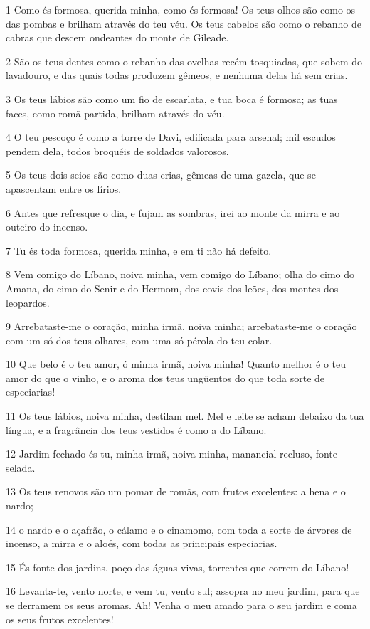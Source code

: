 \par 1 Como és formosa, querida minha, como és formosa! Os teus olhos são como os das pombas e brilham através do teu véu. Os teus cabelos são como o rebanho de cabras que descem ondeantes do monte de Gileade.
\par 2 São os teus dentes como o rebanho das ovelhas recém-tosquiadas, que sobem do lavadouro, e das quais todas produzem gêmeos, e nenhuma delas há sem crias.
\par 3 Os teus lábios são como um fio de escarlata, e tua boca é formosa; as tuas faces, como romã partida, brilham através do véu.
\par 4 O teu pescoço é como a torre de Davi, edificada para arsenal; mil escudos pendem dela, todos broquéis de soldados valorosos.
\par 5 Os teus dois seios são como duas crias, gêmeas de uma gazela, que se apascentam entre os lírios.
\par 6 Antes que refresque o dia, e fujam as sombras, irei ao monte da mirra e ao outeiro do incenso.
\par 7 Tu és toda formosa, querida minha, e em ti não há defeito.
\par 8 Vem comigo do Líbano, noiva minha, vem comigo do Líbano; olha do cimo do Amana, do cimo do Senir e do Hermom, dos covis dos leões, dos montes dos leopardos.
\par 9 Arrebataste-me o coração, minha irmã, noiva minha; arrebataste-me o coração com um só dos teus olhares, com uma só pérola do teu colar.
\par 10 Que belo é o teu amor, ó minha irmã, noiva minha! Quanto melhor é o teu amor do que o vinho, e o aroma dos teus ungüentos do que toda sorte de especiarias!
\par 11 Os teus lábios, noiva minha, destilam mel. Mel e leite se acham debaixo da tua língua, e a fragrância dos teus vestidos é como a do Líbano.
\par 12 Jardim fechado és tu, minha irmã, noiva minha, manancial recluso, fonte selada.
\par 13 Os teus renovos são um pomar de romãs, com frutos excelentes: a hena e o nardo;
\par 14 o nardo e o açafrão, o cálamo e o cinamomo, com toda a sorte de árvores de incenso, a mirra e o aloés, com todas as principais especiarias.
\par 15 És fonte dos jardins, poço das águas vivas, torrentes que correm do Líbano!
\par 16 Levanta-te, vento norte, e vem tu, vento sul; assopra no meu jardim, para que se derramem os seus aromas. Ah! Venha o meu amado para o seu jardim e coma os seus frutos excelentes!

